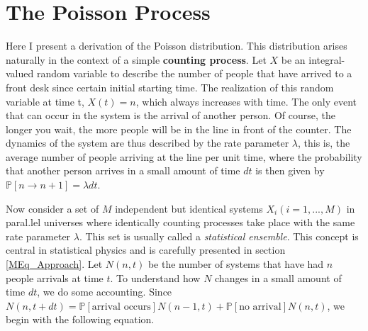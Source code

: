 \documentclass{article}
\newcommand{\Pb}{{\mathbb P}}
\begin{document}
\section{The Poisson Process}
\label{subsection:Poisson_Process}
Here I present a derivation of the Poisson distribution. This distribution arises naturally in the context of a simple \textbf{counting process}. Let $X$ be an integral-valued random variable to describe the number of people that have arrived to a front desk since certain initial starting time. The realization of this random variable at time t, $X(t) = n$, which always increases with time. The only event that can occur in the system is the arrival of another person. Of course, the longer you wait, the more people will be in the line in front of the counter. The dynamics of the system are thus described by the rate parameter $\lambda$, this is, the average number of people arriving at the line per unit time, where the probability that another person arrives in a small amount of time $dt$ is then given by $\Pb[n \rightarrow n+1] = \lambda dt$.
\smallskip

Now consider a set of $M$ independent but identical systems $X_i (i = 1, ..., M)$ in paral.lel universes where identically counting processes take place with the same rate parameter $\lambda$. This set is usually called a {\em statistical ensemble}. This concept is central in statistical physics and is carefully presented in section \ref{MEq_Approach}.  Let $N(n, t)$ be the number of systems that have had $n$ people arrivals at time $t$. To understand how $N$ changes in a small amount of time $dt$, we do some accounting. Since $N(n, t + dt) = \Pb[\textrm{arrival occurs}] N(n-1, t) + \Pb[\textrm{no arrival}] N(n,t)$, we begin with the following equation.
\end{document}
